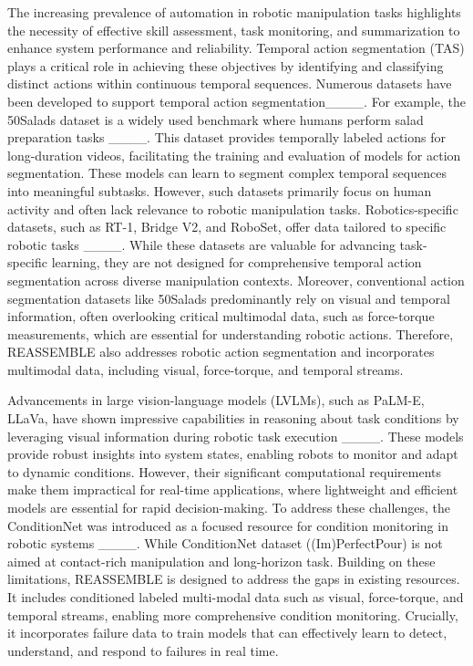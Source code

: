 The increasing prevalence of automation in robotic manipulation tasks highlights the necessity of effective skill assessment, task monitoring, and summarization to enhance system performance and reliability. Temporal action segmentation (TAS) plays a critical role in achieving these objectives by identifying and classifying distinct actions within continuous temporal sequences. Numerous datasets have been developed to support temporal action segmentation____. For example, the 50Salads dataset is a widely used benchmark where humans perform salad preparation tasks ____. This dataset provides temporally labeled actions for long-duration videos, facilitating the training and evaluation of models for action segmentation. These models can learn to segment complex temporal sequences into meaningful subtasks. However, such datasets primarily focus on human activity and often lack relevance to robotic manipulation tasks. Robotics-specific datasets, such as RT-1, Bridge V2, and RoboSet, offer data tailored to specific robotic tasks ____. While these datasets are valuable for advancing task-specific learning, they are not designed for comprehensive temporal action segmentation across diverse manipulation contexts. Moreover, conventional action segmentation datasets like 50Salads predominantly rely on visual and temporal information, often overlooking critical multimodal data, such as force-torque measurements, which are essential for understanding robotic actions. Therefore, REASSEMBLE also addresses robotic action segmentation and incorporates multimodal data, including visual, force-torque, and temporal streams. 

Advancements in large vision-language models (LVLMs), such as PaLM-E, LLaVa, have shown impressive capabilities in reasoning about task conditions by leveraging visual information during robotic task execution ____. These models provide robust insights into system states, enabling robots to monitor and adapt to dynamic conditions. However, their significant computational requirements make them impractical for real-time applications, where lightweight and efficient models are essential for rapid decision-making. To address these challenges, the ConditionNet was introduced as a focused resource for condition monitoring in robotic systems ____. While ConditionNet dataset ((Im)PerfectPour) is not aimed at contact-rich manipulation and long-horizon task. Building on these limitations, REASSEMBLE is designed to address the gaps in existing resources. It includes conditioned labeled multi-modal data such as visual, force-torque, and temporal streams, enabling more comprehensive condition monitoring. Crucially, it incorporates failure data to train models that can effectively learn to detect, understand, and respond to failures in real time. 

